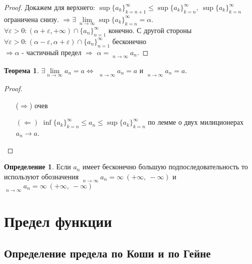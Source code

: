 \documentclass[a4paper, 12pt]{article}
\renewcommand{\epsilon}{\varepsilon}
\newcommand\tab[1][.5cm]{\hspace*{#1}}
\newcommand{\lims}{\lim\limits_{n\to \infty}}
\DeclareMathOperator*\lowlim{\underline{lim}}
\DeclareMathOperator*\uplim{\overline{lim}}
\theoremstyle{definition}
\newtheorem*{definition}{Определение}
\newtheorem*{theorem}{Теорема}
\begin{document}
        \begin{proof}
            Докажем для верхнего: $\sup \{a_k\}_{k=n+1}^{\infty} \leq \sup \{a_k\}_{k=n}^{\infty},\ \sup\{a_k\}_{k=n}^{\infty}$ ограничена снизу. $\Rightarrow \exists\ \lims \sup\{a_k\}_{k=n}^{\infty}=\alpha$. $\forall \epsilon>0: (\alpha+\epsilon,+\infty)\cap \{a_n\}_{n=1}^{\infty}$ конечно. С другой стороны $\forall \epsilon>0: (\alpha-\epsilon, \alpha+\epsilon)\cap \{a_n\}_{n=1}^{\infty}$ бесконечно\\
            $\Rightarrow \alpha$ - частичный предел $\Rightarrow$ $\alpha=\uplim\limits_{n\to \infty}a_n$.
        \end{proof} 
        \begin{theorem}
            $\exists \lims a_n=a \Leftrightarrow$ $\uplim\limits_{n\to \infty}a_n=a$ и $\lowlim\limits_{n\to \infty}a_n=a$.
        \end{theorem} 
        \begin{proof}\tab
            \begin{itemize}
                \item[($\Rightarrow$)] очев
                \item[$(\Leftarrow)$] $\inf \{a_k\}_{k=n}^{\infty}\leq a_n\leq \sup \{a_k\}_{k=n}^{\infty}$ по лемме о двух милиционерах $a_n \to a$. 
            \end{itemize}
        \end{proof} 
        \begin{definition}
            Если $a_n$ имеет бесконечно большую подпоследовательность то используют обозначения $\uplim\limits_{n\to \infty}a_n=\infty\ (+\infty,\ -\infty)$ и $\lowlim\limits_{n\to \infty}a_n=\infty\ (+\infty,\ -\infty)$
        \end{definition}
    \section{Предел функции}
    \subsection{Определение предела по Коши и по Гейне}
    
\end{document}
